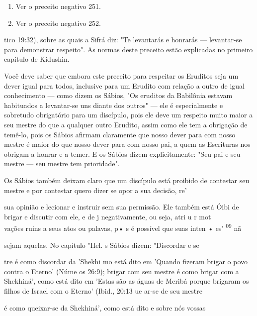 \begin{enumerate}
\def\labelenumi{\arabic{enumi}.}
\setcounter{enumi}{206}
\item
 
 Ver o preceito negativo 251.
 
\item
 
 Ver o preceito negativo 252.
 
\end{enumerate}




tico 19:32), sobre as quais a Sifrá diz: "Te levantarás e honrarás ---
levantar-se para demonstrar respeito". As normas deste preceito estão
explicadas no pri­meiro capítulo de Kidushin.

Você deve saber que embora este preceito para respeitar os Erudi­tos
seja um dever igual para todos, inclusive para um Erudito com relação a
outro de igual conhecimento --- como dizem os Sábios, "Os eruditos da
Babi­lônia estavam habituados a levantar-se uns diante dos outros" ---
ele é especial­mente e sobretudo obrigatório para um discípulo, pois ele
deve um respeito muito maior a seu mestre do que a qualquer outro
Erudito, assim como ele tem a obrigação de temê-lo, pois os Sábios
afirmam claramente que nosso dever pa­ra com nosso mestre é maior do que
nosso dever para com nosso pai, a quem as Escrituras nos obrigam a
honrar e a temer. E os Sábios dizem explicitamente: "Seu pai e seu
mestre --- seu mestre tem prioridade".

Os Sábios também deixam claro que um discípulo está proibido de
contestar seu mestre e por contestar quero dizer se opor a sua decisão,
re'

sua opinião e lecionar e instruir sem sua permissão. Ele também está
Óibi de brigar e discutir com ele, e de j negativamente, ou seja, atri u
r mot\\
vações ruins a seus atos ou palavas, p• s é possível que suas inten •
es' \textsuperscript{09} nã

sejam aquelas. No capítulo "Hel. s Sábios dizem: "Discordar e se

tre é como discordar da 'Shekhi mo está dito em 'Quando fizeram brigar o
povo contra o Eterno' (Núme os 26:9); brigar com seu mestre é como
brigar com a Shekhiná', como está dito em 'Estas são as águas de Meribá
porque bri­garam os filhos de Israel com o Eterno' (Ibid., 20:13 ue
ar-se de seu mestre

é como queixar-se da Shekhiná', como está dito e sobre nós vossas

